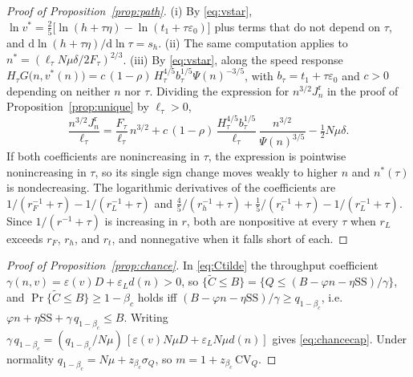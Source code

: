 \documentclass[11pt]{article}
\theoremstyle{definition}
\theoremstyle{remark}
\theoremstyle{plain}
\newcommand{\sstock}{\mathrm{SS}}
\begin{document}
\begin{proof}[Proof of Proposition~\ref{prop:path}]
(i) By \eqref{eq:vstar}, $\ln v^*=\tfrac25\big[\ln(h+\tau\eta)-\ln(t_1+\tau\varepsilon_0)\big]$ plus terms that
do not depend on $\tau$, and $\mathrm d\ln(h+\tau\eta)/\mathrm d\ln\tau=s_h$. (ii) The same computation
applies to $n^*=(\ell_\tau N\mu\delta/2F_\tau)^{2/3}$. (iii) By \eqref{eq:vstar}, along the speed response
$H_\tau G\big(n,v^*(n)\big)=c\,(1-\rho)\,H_\tau^{4/5}b_\tau^{1/5}\Psi(n)^{-3/5}$, with $b_\tau=t_1+\tau\varepsilon_0$
and $c>0$ depending on neither $n$ nor $\tau$. Dividing the expression for $n^{3/2}J^{\mathrm r}_n$ in the
proof of Proposition~\ref{prop:unique} by $\ell_\tau>0$,
\[
  \frac{n^{3/2}J^{\mathrm r}_n}{\ell_\tau}=\frac{F_\tau}{\ell_\tau}\,n^{3/2}
  +c\,(1-\rho)\,\frac{H_\tau^{4/5}b_\tau^{1/5}}{\ell_\tau}\,\frac{n^{3/2}}{\Psi(n)^{3/5}}-\tfrac12N\mu\delta .
\]
If both coefficients are nonincreasing in $\tau$, the expression is pointwise nonincreasing in $\tau$, so its
single sign change moves weakly to higher $n$ and $n^*(\tau)$ is nondecreasing. The logarithmic derivatives of
the coefficients are $1/(r_F^{-1}+\tau)-1/(r_L^{-1}+\tau)$ and
$\tfrac45/(r_h^{-1}+\tau)+\tfrac15/(r_t^{-1}+\tau)-1/(r_L^{-1}+\tau)$. Since $1/(r^{-1}+\tau)$ is increasing in
$r$, both are nonpositive at every $\tau$ when $r_L$ exceeds $r_F$, $r_h$, and $r_t$, and nonnegative when it
falls short of each.
\end{proof}

\begin{proof}[Proof of Proposition~\ref{prop:chance}]
In \eqref{eq:Ctilde} the throughput coefficient $\gamma(n,v)=\varepsilon(v)D+\varepsilon_L d(n)>0$, so
$\{\tilde C\le B\}=\{Q\le(B-\varphi n-\eta\sstock)/\gamma\}$, and $\Pr\{\tilde C\le B\}\ge 1-\beta_c$ holds iff
$(B-\varphi n-\eta\sstock)/\gamma\ge q_{1-\beta_c}$, i.e.\ $\varphi n+\eta\sstock+\gamma\,q_{1-\beta_c}\le B$. Writing
$\gamma\,q_{1-\beta_c}=(q_{1-\beta_c}/N\mu)\,[\varepsilon(v)N\mu D+\varepsilon_L N\mu d(n)]$ gives \eqref{eq:chancecap}.
Under normality $q_{1-\beta_c}=N\mu+z_{\beta_c}\sigma_Q$, so $m=1+z_{\beta_c}\,\mathrm{CV}_Q$.
\end{proof}
\end{document}
